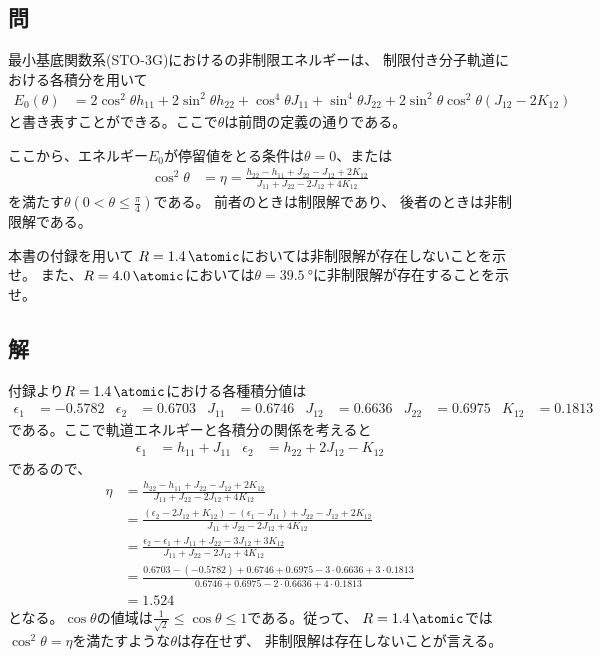 \subsection{問}
最小基底関数系(STO-3G)におけるの非制限エネルギーは、
制限付き分子軌道における各積分を用いて
\begin{align}
	E_0(\theta)
&=
	2
	\cos^2\theta
	h_{11}
	+
	2
	\sin^2\theta
	h_{22}
	+
	\cos^4\theta
	J_{11}
	+
	\sin^4\theta
	J_{22}
	+
	2
	\sin^2\theta
	\cos^2\theta
	(J_{12} -2K_{12})
\end{align}
と書き表すことができる。ここで$\theta$は前問の定義の通りである。

ここから、エネルギー$E_0$が停留値をとる条件は$\theta=0$、または
\begin{align}
	\cos^2\theta
&=
	\eta
=
	\frac{
		h_{22} -h_{11} +J_{22} -J_{12} +2K_{12}
	}{
		J_{11} +J_{22} -2J_{12} +4K_{12}
	}
\end{align}
を満たす$\theta(0<\theta\leq\frac{\pi}{4})$である。
前者のときは制限解であり、
後者のときは非制限解である。

本書の付録を用いて
$R=\SI{1.4}{\atomic}$においては非制限解が存在しないことを示せ。
また、$R=\SI{4.0}{\atomic}$においては$\theta=\SI{39.5}{\degree}$に非制限解が存在することを示せ。


\subsection{解}
付録より$R=\SI{1.4}{\atomic}$における各種積分値は
\begin{align}
	\epsilon_1
&=
	-0.5782 &
%
%
	\epsilon_2
&=
	0.6703 &
%
%
	J_{11}
&=
	0.6746 &
%
%
	J_{12}
&=
	0.6636 &
%
%
	J_{22}
&=
	0.6975 &
%
%
	K_{12}
&=
	0.1813
\end{align}
である。ここで軌道エネルギーと各積分の関係を考えると
\begin{align}
	\epsilon_1
&=
	h_{11}
	+
	J_{11} &
%
%
	\epsilon_2
&=
	h_{22}
	+
	2J_{12}
	-
	K_{12}
\end{align}
であるので、
\begin{align}
	\eta
&=
	\frac{
		h_{22} -h_{11} +J_{22} -J_{12} +2K_{12}
	}{
		J_{11} +J_{22} -2J_{12} +4K_{12}
	} \\
%
%
&=
	\frac{
		(\epsilon_2 -2J_{12} +K_{12}) -(\epsilon_1 -J_{11}) +J_{22} -J_{12} +2K_{12}
	}{
		J_{11} +J_{22} -2J_{12} +4K_{12}
	} \\
%
%
&=
	\frac{
		\epsilon_2 -\epsilon_1
		+J_{11} +J_{22} -3J_{12} +3K_{12}
	}{
		J_{11} +J_{22} -2J_{12} +4K_{12}
	} \\
%
%
&=
	\frac{
		0.6703 -(-0.5782)
		+0.6746 +0.6975 -3\cdot0.6636 +3\cdot0.1813
	}{
		0.6746 +0.6975 -2\cdot0.6636 +4\cdot0.1813
	} \\
%
%
&=
	1.524
\end{align}
となる。$\cos\theta$の値域は$\frac{1}{\sqrt{2}}\leq\cos\theta\leq 1$である。従って、
$R=\SI{1.4}{\atomic}$では$\cos^2\theta=\eta$を満たすような$\theta$は存在せず、
非制限解は存在しないことが言える。

